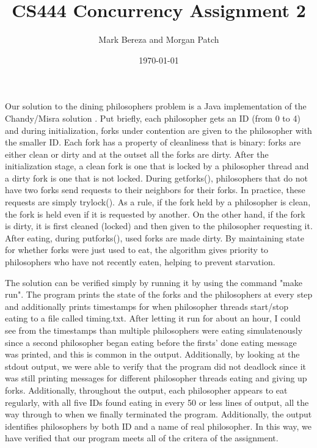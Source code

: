 \documentclass[onecolumn, draftclsnofoot,10pt, compsoc]{IEEEtran}
\begin{document}
\title{CS444 Concurrency Assignment 2}
\author{Mark Bereza and Morgan Patch}
\date{\today}
\maketitle
Our solution to the dining philosophers problem is a Java implementation of the Chandy/Misra solution \cite{ChandyMisra}. Put briefly, each philosopher gets an ID (from 0 to 4) and during initialization, forks under contention are given to the philosopher with the smaller ID. Each fork has a property of cleanliness that is binary: forks are either clean or dirty and at the outset all the forks are dirty. After the initialization stage, a clean fork is one that is locked by a philosopher thread and a dirty fork is one that is not locked. During getforks(), philosophers that do not have two forks send requests to their neighbors for their forks. In practice, these requests are simply trylock(). As a rule, if the fork held by a philosopher is clean, the fork is held even if it is requested by another. On the other hand, if the fork is dirty, it is first cleaned (locked) and then given to the philosopher requesting it. After eating, during putforks(), used forks are made dirty. By maintaining state for whether forks were just used to eat, the algorithm gives priority to philosophers who have not recently eaten, helping to prevent starvation.

The solution can be verified simply by running it by using the command "make run". The program prints the state of the forks and the philosophers at every step and additionally prints timestamps for when philosopher threads start/stop eating to a file called timing.txt. After letting it run for about an hour, I could see from the timestamps than multiple philosophers were eating simulatenously since a second philosopher began eating before the firsts' done eating message was printed, and this is common in the output. Additionally, by looking at the stdout output, we were able to verify that the program did not deadlock since it was still printing messages for different philosopher threads eating and giving up forks. Additionally, throughout the output, each philosopher appears to eat regularly, with all five IDs found eating in every 50 or less lines of output, all the way through to when we finally terminated the program. Additionally, the output identifies philosophers by both ID and a name of real philosopher. In this way, we have verified that our program meets all of the critera of the assignment.


\end{document}
